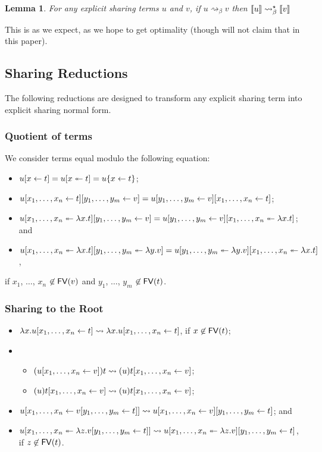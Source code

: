 \documentclass[10pt,a4paper]{article}
\theoremstyle{definition}
\theoremstyle{plain}
\newtheorem{lemma}[definition]{Lemma}
\theoremstyle{remark}
\begin{document}
\begin{lemma}
For any explicit sharing terms $u$ and $v$, if $u\rightsquigarrow_\beta v$ then ${\llbracket{u}\rrbracket}\rightsquigarrow^\star_\beta{\llbracket{v}\rrbracket}$
\end{lemma}

This is as we expect, as we hope to get optimality (though will not claim that in this paper).

\subsection{Sharing Reductions}

The following reductions are designed to transform any explicit sharing term into explicit sharing normal form.

\subsubsection{Quotient of terms}

We consider terms equal modulo the following equation:

\begin{itemize}
 \item ${ {u}[{x}\leftarrow{t}] }={ {u}[{x}\twoheadleftarrow{t}] }=u\{x\leftarrow t\}$;
 \item ${ { {{ { {u}[{{x_1},\dots,{x_n}}\leftarrow{t}] } }}[{{y_1},\dots,{y_m}}\leftarrow{v}] } }={ { {{ { {u}[{{y_1},\dots,{y_m}}\leftarrow{v}] } }}[{{x_1},\dots,{x_n}}\leftarrow{t}] } }$;
 \item ${ { {{ { {u}[{{x_1},\dots,{x_n}}\twoheadleftarrow{\lambda{x}.{t}}] } }}[{{y_1},\dots,{y_m}}\leftarrow{v}] } }={ { {{ { {u}[{{y_1},\dots,{y_m}}\leftarrow{v}] } }}[{{x_1},\dots,{x_n}}\twoheadleftarrow{\lambda{x}.{t}}] } }$; and
 \item ${ { {{ { {u}[{{x_1},\dots,{x_n}}\twoheadleftarrow{\lambda{x}.{t}}] } }}[{{y_1},\dots,{y_m}}\twoheadleftarrow{\lambda{y}.{v}}] } }={ { {{ { {u}[{{y_1},\dots,{y_m}}\twoheadleftarrow{\lambda{y}.{v}}] } }}[{{x_1},\dots,{x_n}}\twoheadleftarrow{\lambda{x}.{t}}] } }$,
\end{itemize}
if $x_1$, $\dots$, $x_n$ $\not\in{\mathop{\mathsf{FV}}}(v)$ and $y_1$, $\dots$, $y_m$ $\not\in{\mathop{\mathsf{FV}}}(t)$.

\subsubsection{Sharing to the Root}

\begin{itemize}
 \item $\lambda x.{ { {u}[{{x_1},\dots,{x_n}}\leftarrow{t}] } }\rightsquigarrow{  { {\lambda x.u}[{{x_1},\dots,{x_n}}\leftarrow{t}] }  }$, if $x\not\in{\mathop{\mathsf{FV}}}(t)$;
 \item \begin{itemize}
        \item $({ { {u}[{{x_1},\dots,{x_n}}\leftarrow{v}] } })t\rightsquigarrow{  { {(u)t}[{{x_1},\dots,{x_n}}\leftarrow{v}] }  }$;
        \item $(u){ { {t}[{{x_1},\dots,{x_n}}\leftarrow{v}] } }\rightsquigarrow{  { {(u)t}[{{x_1},\dots,{x_n}}\leftarrow{v}] }  }$;
       \end{itemize}
 \item ${ { {u}[{{x_1},\dots,{x_n}}\leftarrow{ {  { {v}[{{y_1},\dots,{y_m}}\leftarrow{t}] }  } }] } }\rightsquigarrow{  { { {  { {u}[{{x_1},\dots,{x_n}}\leftarrow{v}] }  } }[{{y_1},\dots,{y_m}}\leftarrow{t}] }  }$; and
 \item ${ { {u}[{{x_1},\dots,{x_n}}\twoheadleftarrow{\lambda{z}.{ {  { {v}[{{y_1},\dots,{y_m}}\leftarrow{t}] }  } }}] } }\rightsquigarrow{  { { {  { {u}[{{x_1},\dots,{x_n}}\twoheadleftarrow{\lambda{z}.{v}}] }  } }[{{y_1},\dots,{y_m}}\leftarrow{t}] }  }$, if $z\not\in{\mathop{\mathsf{FV}}}(t)$.
\end{itemize}
\end{document}
